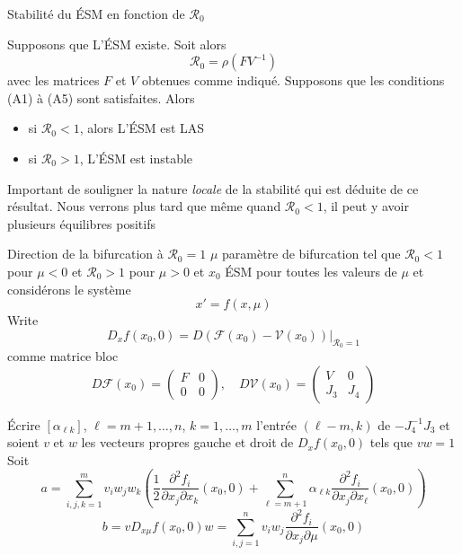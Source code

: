 \documentclass[aspectratio=169]{beamer}\usepackage[]{graphicx}\usepackage[]{xcolor}
\begin{document}
\begin{frame}{Stabilité du ÉSM en fonction de $\mathcal{R}_0$}
\begin{theorem}\label{th:R0_VdDW}
Supposons que L'ÉSM existe. Soit alors
\[
\mathcal{R}_0=\rho(FV^{-1})
\]
avec les matrices $F$ et $V$ obtenues comme indiqué. Supposons que les conditions (A1) à (A5) sont satisfaites. Alors
\begin{itemize}
\item si $\mathcal{R}_0<1$, alors L'ÉSM est LAS
\item si $\mathcal{R}_0>1$, L'ÉSM est instable
\end{itemize}
\end{theorem}
\vfill
Important de souligner la nature \emph{locale} de la stabilité qui est déduite de ce résultat. Nous verrons plus tard que même quand $\mathcal{R}_0<1$, il peut y avoir plusieurs équilibres positifs
\end{frame}

\begin{frame}{Direction de la bifurcation à $\mathcal{R}_0=1$}
$\mu$ paramètre de bifurcation tel que $\mathcal{R}_0<1$ pour $\mu<0$ et $\mathcal{R}_0>1$ pour $\mu>0$ et $x_0$ ÉSM pour toutes les valeurs de $\mu$ et considérons le système
\begin{equation}
\label{eq:sys_PvdDW}
x'=f(x,\mu)
\end{equation}
\vfill
Write 
\[
D_xf(x_0,0)=
\left. 
  D(\mathcal{F}(x_0)-\mathcal{V}(x_0))
\right|_{\mathcal{R}_0=1}
\]
comme matrice bloc
\[
D\mathcal{F}(x_0)
=\begin{pmatrix}
F & 0 \\ 0 & 0
\end{pmatrix},
\quad
D\mathcal{V}(x_0)
=\begin{pmatrix}
V & 0 \\ J_3 & J_4
\end{pmatrix}
\]
\end{frame}

\begin{frame}
Écrire $[\alpha_{\ell k}]$, $\ell=m+1,\ldots,n$, $k=1,\ldots,m$ l'entrée $(\ell-m,k)$ de $-J_4^{-1}J_3$ et soient $v$ et $w$ les vecteurs propres gauche et droit de $D_xf(x_0,0)$ tels que $vw=1$
\vfill
Soit
\begin{equation}
\label{eq:PvdDW_a}
a =\sum_{i,j,k=1}^m
v_iw_jw_k
\left(
\frac 12 
\frac{\partial^2f_i}{\partial x_j\partial x_k}(x_0,0)
+\sum_{\ell=m+1}^n
\alpha_{\ell k}
\frac{\partial^2f_i}{\partial x_j\partial x_\ell}(x_0,0)
\right)
\end{equation}
\vfill
\begin{equation}
\label{eq:PvdDW_b}
b
=vD_{x\mu}f(x_0,0)w
=\sum_{i,j=1}^n v_iw_j
\frac{\partial^2f_i}{\partial x_j\partial\mu}
(x_0,0)
\end{equation}
\end{frame}
\end{document}
